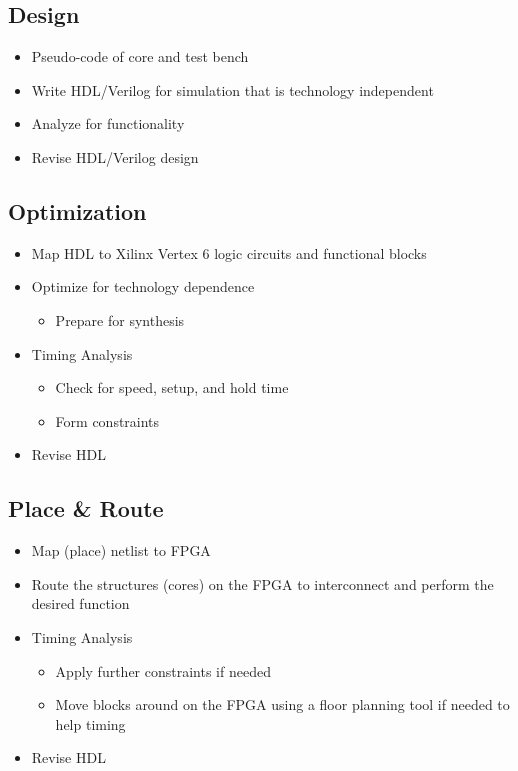 \documentclass[]{report}   %
\begin{document}
\subsection{Design}
\begin{itemize}
  \item{Pseudo-code of core and test bench}
  \item{Write HDL/Verilog for simulation that is technology independent}
  \item{Analyze for functionality}
  \item{Revise HDL/Verilog design}
\end{itemize}

\subsection{Optimization}
\begin{itemize}
  \item{Map HDL to Xilinx Vertex 6 logic circuits and functional blocks}
  \item{Optimize for technology dependence}
    \begin{itemize}
      \item{Prepare for synthesis}
    \end{itemize}
  \item{Timing Analysis}
    \begin{itemize}
      \item{Check for speed, setup, and hold time}
      \item{Form constraints}
    \end{itemize}
  \item{Revise HDL}
\end{itemize}

\subsection{Place \& Route}
\begin{itemize}
  \item{Map (place) netlist to FPGA}
  \item{Route the structures (cores) on the FPGA to interconnect and perform the desired function}
  \item{Timing Analysis}
    \begin{itemize}
      \item{Apply further constraints if needed}
      \item{Move blocks around on the FPGA using a floor planning tool if needed to help timing}
    \end{itemize}
  \item{Revise HDL}
\end{itemize}
\end{document}
